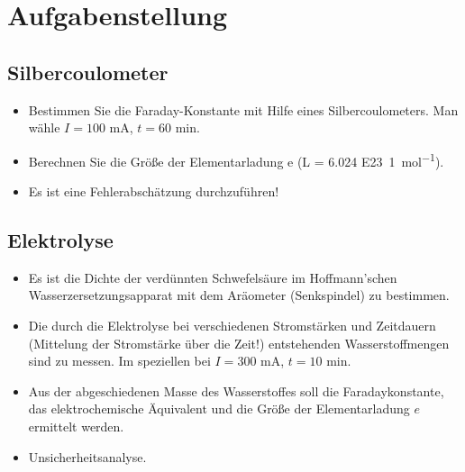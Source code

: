 \documentclass[11pt,ngerman]{scrartcl}
\begin{document}

\tableofcontents
\newpage

\section{Aufgabenstellung\label{Auf0}}

\subsection{Silbercoulometer}

\begin{itemize}

	\item Bestimmen Sie die Faraday-Konstante mit Hilfe eines Silbercoulometers. Man wähle $I = 100$ mA, $t = 60$ min.

	\item Berechnen Sie die Größe der Elementarladung e (L = \SI{6.024 E23}{1\per\mol}).

	\item Es ist eine Fehlerabschätzung durchzuführen!

\end{itemize}


\subsection{Elektrolyse}

\begin{itemize}

	\item Es ist die Dichte der verdünnten Schwefelsäure im Hoffmann'schen Wasserzersetzungsapparat mit dem Aräometer (Senkspindel) zu bestimmen.

	\item Die durch die Elektrolyse bei verschiedenen Stromstärken und Zeitdauern (Mittelung der
	      Stromstärke über die Zeit!) entstehenden Wasserstoffmengen sind zu messen. Im speziellen
	      bei $I = 300$ mA, $t = 10$ min.

	\item Aus der abgeschiedenen Masse des Wasserstoffes soll die Faradaykonstante, das elektrochemische Äquivalent und die Größe der Elementarladung $e$ ermittelt werden.

	\item Unsicherheitsanalyse.

\end{itemize}

\newpage
\end{document}
